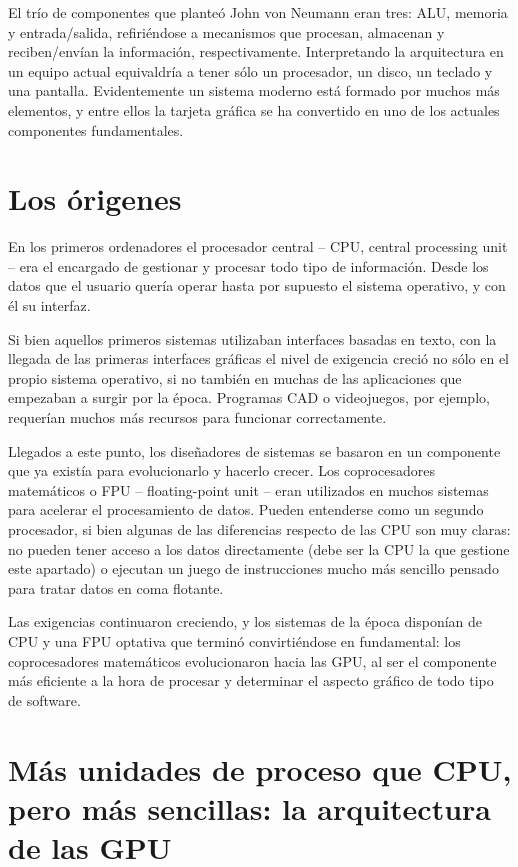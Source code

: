 \documentclass[a4paper,openright,12pt, oneside]{book}
\begin{document}
El tr\'io de componentes que plante\'o John von Neumann eran tres: ALU, memoria y entrada/salida, refiri\'endose a mecanismos que procesan, almacenan y reciben/envían la informaci\'on, respectivamente. Interpretando la arquitectura en un equipo actual equivaldr\'ia a tener s\'olo un procesador, un disco, un teclado y una pantalla. Evidentemente un sistema moderno est\'a formado por muchos m\'as elementos, y entre ellos la tarjeta gr\'afica se ha convertido en uno de los actuales componentes fundamentales.

\section{Los \'origenes}

En los primeros ordenadores el procesador central -- CPU, central processing unit -- era el encargado de gestionar y procesar todo tipo de informaci\'on. Desde los datos que el usuario quería operar hasta por supuesto el sistema operativo, y con \'el su interfaz.

Si bien aquellos primeros sistemas utilizaban interfaces basadas en texto, con la llegada de las primeras interfaces gráficas el nivel de exigencia creci\'o no s\'olo en el propio sistema operativo, si no tambi\'en en muchas de las aplicaciones que empezaban a surgir por la \'epoca. Programas CAD o videojuegos, por ejemplo, requer\'ian muchos m\'as recursos para funcionar correctamente.

Llegados a este punto, los dise\~nadores de sistemas se basaron en un componente que ya exist\'ia para evolucionarlo y hacerlo crecer. Los coprocesadores matem\'aticos o FPU -- floating-point unit -- eran utilizados en muchos sistemas para acelerar el procesamiento de datos. Pueden entenderse como un segundo procesador, si bien algunas de las diferencias respecto de las CPU son muy claras: no pueden tener acceso a los datos directamente (debe ser la CPU la que gestione este apartado) o ejecutan un juego de instrucciones mucho m\'as sencillo pensado para tratar datos en coma flotante.

Las exigencias continuaron creciendo, y los sistemas de la \'epoca dispon\'ian de CPU y una FPU optativa que termin\'o convirti\'endose en fundamental: los coprocesadores matem\'aticos evolucionaron hacia las GPU, al ser el componente m\'as eficiente a la hora de procesar y determinar el aspecto gr\'afico de todo tipo de software.

\section{M\'as unidades de proceso que CPU, pero m\'as sencillas: la arquitectura de las GPU}
\end{document}
